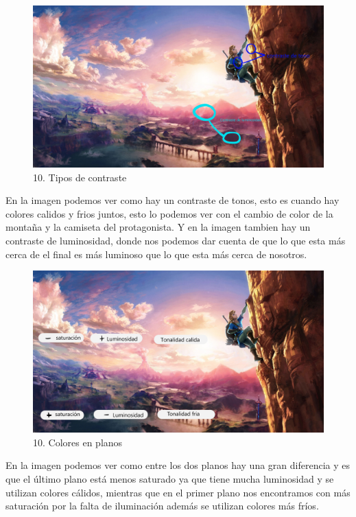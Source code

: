 \documentclass[12pt]{article}
\begin{document}
        \begin{figure}[H]
          \centering
          \includegraphics[scale=0.35]{images/Selena/10_concept_art contrastes.jpg}
          \caption{\small 10. Tipos de contraste}
        \end{figure}
        En la imagen podemos ver como hay un contraste de tonos, esto es cuando hay colores calidos y frios juntos, esto lo podemos ver con el cambio de color de la montaña y la camiseta del protagonista. Y en la imagen tambien hay un contraste de luminosidad, donde nos podemos dar cuenta de que lo que esta más cerca de el final es más luminoso que lo que esta más cerca de nosotros. 
        \begin{figure}[H]
          \centering
          \includegraphics[scale=0.35]{images/Selena/10_concept_art c.jpg}
          \caption{\small 10. Colores en planos}
        \end{figure}
        En la imagen podemos ver como entre los dos planos hay una gran diferencia y es que el último plano está menos saturado ya que tiene mucha luminosidad y se utilizan colores cálidos, mientras que en el primer plano nos encontramos con más saturación por la falta de iluminación además se utilizan colores más fríos. 
\end{document}
